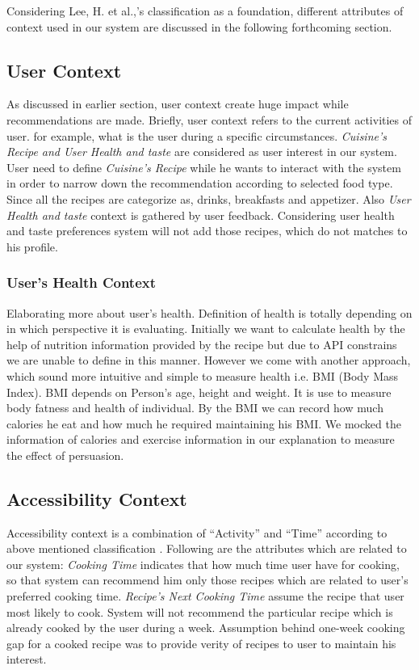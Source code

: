 Considering Lee, H. et al.,’s classification\cite{lee2005context} as a foundation, different attributes of  context used in our system are discussed in the following forthcoming section.

\subsection{User Context}

As discussed in earlier section, user context create huge impact while recommendations are made.  Briefly, user context refers to the current activities of user. for example, what is the user during a specific circumstances. \textit{Cuisine’s Recipe and User Health and taste} are considered as  user interest in our system. User need to define \textit{ Cuisine’s Recipe} while he wants to interact with the system in order to narrow down the recommendation  according to selected food type. Since all the recipes are categorize as, drinks, breakfasts and appetizer.  Also \textit{User Health and taste}  context is gathered by user feedback. Considering user health and taste preferences system will not add those recipes, which do not matches to his profile. 
	
\subsubsection{User's Health Context}

Elaborating more about user’s health. Definition of health is totally depending on in which perspective it is evaluating. Initially we want to calculate health by the help of nutrition information provided by the recipe but due to API constrains we are unable to define in this manner. However we come with another approach, which sound more intuitive and simple to measure health i.e. BMI (Body Mass Index). BMI depends on Person’s age, height and weight. It is use to measure body fatness and health of individual. By the BMI we can record how much calories he eat and how much he required maintaining his BMI. We mocked the information of calories and exercise information in our explanation to measure the effect of persuasion. 


\subsection{Accessibility Context}
	
Accessibility context is a combination of “Activity” and “Time” according to above mentioned classification \cite{lee2005context}.  Following are the attributes which are related to our system: \textit{Cooking Time} indicates that how much time user have for cooking, so that system can recommend him only those recipes which are related to user’s preferred cooking time. \textit{Recipe’s Next Cooking Time} assume the recipe that user most likely to cook. System will not recommend the particular recipe which is already cooked by the user during a week. Assumption behind one-week cooking gap for a cooked recipe was to provide verity of recipes to user to maintain his interest. 
	


